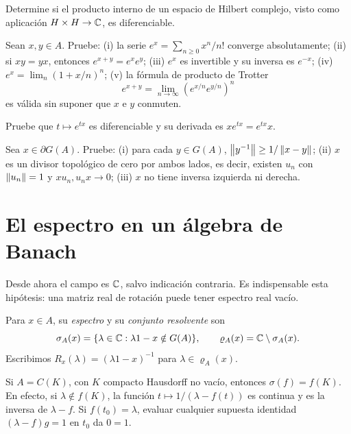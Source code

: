 \begin{ejercicio}\label{ej:v3-l21-2}
Determine si el producto interno de un espacio de Hilbert complejo, visto como aplicación $H\times H\to\mathbb C$, es diferenciable.
\end{ejercicio}


\begin{ejercicio}\label{ej:v3-l21-3}
Sean $x,y\in A$. Pruebe: (i) la serie $e^x=\sum_{n\ge0}x^n/n!$ converge absolutamente; (ii) si $xy=yx$, entonces $e^{x+y}=e^xe^y$; (iii) $e^x$ es invertible y su inversa es $e^{-x}$; (iv) $e^x=\lim_n(1+x/n)^n$; (v) la fórmula de producto de Trotter
\[
 e^{x+y}=\lim_{n\to\infty}(e^{x/n}e^{y/n})^n
\]
es válida sin suponer que $x$ e $y$ conmuten.
\end{ejercicio}


\begin{ejercicio}\label{ej:v3-l21-4}
Pruebe que $t\mapsto e^{tx}$ es diferenciable y su derivada es $xe^{tx}=e^{tx}x$.
\end{ejercicio}


\begin{ejercicio}\label{ej:v3-l21-5}
Sea $x\in\partial G(A)$. Pruebe: (i) para cada $y\in G(A)$,
$\left\lVert y^{-1}\right\rVert\ge1/\left\lVert x-y\right\rVert$; (ii) $x$ es un divisor topológico de cero por ambos lados, es decir, existen $u_n$ con $\left\lVert u_n\right\rVert=1$ y $xu_n,u_nx\to0$; (iii) $x$ no tiene inversa izquierda ni derecha.
\end{ejercicio}


\section{El espectro en un álgebra de Banach}\label{lec:v3-22}

Desde ahora el campo es $\mathbb C$, salvo indicación contraria. Es indispensable esta hipótesis: una matriz real de rotación puede tener espectro real vacío.

\begin{definicion}
Para $x\in A$, su \emph{espectro} y su \emph{conjunto resolvente} son
\[
 \sigma_A(x)=\{\lambda\in\mathbb C:\lambda1-x\notin G(A)\},
 \qquad \varrho_A(x)=\mathbb C\setminus\sigma_A(x).
\]
Escribimos $R_x(\lambda)=(\lambda1-x)^{-1}$ para $\lambda\in\varrho_A(x)$.
\end{definicion}

\begin{ejemplo}
Si $A=C(K)$, con $K$ compacto Hausdorff no vacío, entonces $\sigma(f)=f(K)$. En efecto, si $\lambda\notin f(K)$, la función $t\mapsto1/(\lambda-f(t))$ es continua y es la inversa de $\lambda-f$. Si $f(t_0)=\lambda$, evaluar cualquier supuesta identidad $(\lambda-f)g=1$ en $t_0$ da $0=1$.
\end{ejemplo}

